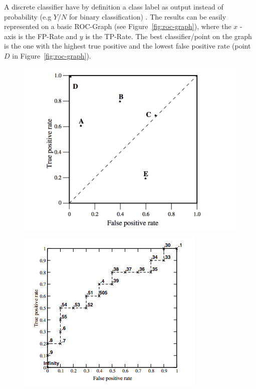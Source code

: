A discrete classifier have by definition a class label as output instead of probability (e.g \(Y\)/\(N\) for binary classification) \cite{Fawcett:2006:IRA:1159473.1159475}. The results can be easily  represented on a basic ROC-Graph (see Figure~\ref{fig:roc-graph}), where the \(x\) - axis is the FP-Rate and \(y\) is the TP-Rate. The best classifier/point on the graph is the one with the highest true positive and the lowest false positive rate (point \(D\) in Figure~\ref{fig:roc-graph}).
\begin{figure}
\centering
\begin{minipage}{.5\textwidth}
  \centering
  \includegraphics[scale=0.47]{Graphics/roc-graph.png}
  \label{fig:roc-graph}
\end{minipage}%
\begin{minipage}{.5\textwidth}
  \centering
    \includegraphics[scale=0.57]{Graphics/roc-curve.png}
  \label{fig:roc-curve}
\end{minipage}
\end{figure}
